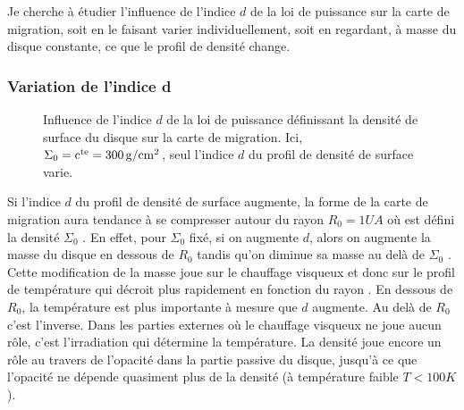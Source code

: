 Je cherche à étudier l'influence de l'indice $d$ de la loi de puissance sur la carte de migration, soit en le faisant varier individuellement, soit en regardant, à masse du disque constante, ce que le profil de densité change.

\subsubsection{Variation de l'indice d}
\begin{figure}[htb]
\centering
{}\hfill
{}

\hfill
{}

\caption{Influence de l'indice $d$ de la loi de puissance définissant la densité de surface du disque sur la carte de migration.
Ici, $\Sigma_0=\mathrm{c^{te}}=300\mathrm{\thinspace g/cm^2}$, seul l'indice $d$ du profil de densité de surface varie. }\label{fig:map_index}
\end{figure}

Si l'indice $d$ du profil de densité de surface augmente, la forme de la carte de migration aura tendance à se compresser autour du rayon $R_0=1\unit{UA}$ où est défini la densité $\Sigma_0$ . En effet, pour $\Sigma_0$ fixé, si on augmente $d$, alors on augmente la masse du disque en dessous de $R_0$ tandis qu'on diminue sa masse au delà de $\Sigma_0$ . Cette modification de la masse joue sur le chauffage visqueux et donc sur le profil de température qui décroit plus rapidement en fonction du rayon . En dessous de $R_0$, la température est plus importante à mesure que $d$ augmente. Au delà de $R_0$ c'est l'inverse. Dans les parties externes où le chauffage visqueux ne joue aucun rôle, c'est l'irradiation qui détermine la température. La densité joue encore un rôle au travers de l'opacité dans la partie passive du disque, jusqu'à ce que l'opacité ne dépende quasiment plus de la densité (à température faible $T<100\unit{K}$).

